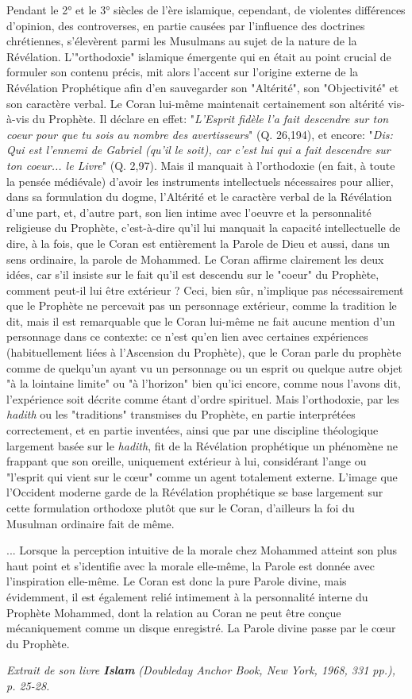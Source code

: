 Pendant le 2° et le 3° siècles de l'ère islamique, cependant, de
violentes différences d'opinion, des controverses, en partie causées par
l'influence des doctrines chrétiennes, s'élevèrent parmi les Musulmans
au sujet de la nature de la Révélation. L'"orthodoxie" islamique
émergente qui en était au point crucial de formuler son contenu précis,
mit alors l'accent sur l'origine externe de la Révélation Prophétique
afin d'en sauvegarder son "Altérité", son "Objectivité" et son caractère
verbal. Le Coran lui-même maintenait certainement son altérité vis-à-vis
du Prophète. Il déclare en effet: "\emph{L'Esprit fidèle l'a fait
descendre sur ton coeur pour que tu sois au nombre des avertisseurs}"
(Q. 26,194), et encore: "\emph{Dis: Qui est l'ennemi de Gabriel (qu'il
le soit), car c'est lui qui a fait descendre sur ton coeur... le Livre}"
(Q. 2,97). Mais il manquait à l'orthodoxie (en fait, à toute la pensée
médiévale) d'avoir les instruments intellectuels nécessaires pour
allier, dans sa formulation du dogme, l'Altérité et le caractère verbal
de la Révélation d'une part, et, d'autre part, son lien intime avec
l'oeuvre et la personnalité religieuse du Prophète, c'est-à-dire qu'il
lui manquait la capacité intellectuelle de dire, à la fois, que le Coran
est entièrement la Parole de Dieu et aussi, dans un sens ordinaire, la
parole de Mohammed. Le Coran affirme clairement les deux idées, car s'il
insiste sur le fait qu'il est descendu sur le "coeur" du Prophète,
comment peut-il lui être extérieur ? Ceci, bien sûr, n'implique pas
nécessairement que le Prophète ne percevait pas un personnage extérieur,
comme la tradition le dit, mais il est remarquable que le Coran lui-même
ne fait aucune mention d'un personnage dans ce contexte: ce n'est qu'en
lien avec certaines expériences (habituellement liées à l'Ascension du
Prophète), que le Coran parle du prophète comme de quelqu'un ayant vu un
personnage ou un esprit ou quelque autre objet "à la lointaine limite"
ou "à l'horizon" bien qu'ici encore, comme nous l'avons dit,
l'expérience soit décrite comme étant d'ordre spirituel. Mais
l'orthodoxie, par les \emph{hadith} ou les "traditions" transmises du
Prophète, en partie interprétées correctement, et en partie inventées,
ainsi que par une discipline théologique largement basée sur le
\emph{hadith}, fit de la Révélation prophétique un phénomène ne frappant
que son oreille, uniquement extérieur à lui, considérant l'ange ou
"l'esprit qui vient sur le cœur" comme un agent totalement externe.
L'image que l'Occident moderne garde de la Révélation prophétique se
base largement sur cette formulation orthodoxe plutôt que sur le Coran,
d'ailleurs la foi du Musulman ordinaire fait de même.

... Lorsque la perception intuitive de la morale chez Mohammed atteint
son plus haut point et s'identifie avec la morale elle-même, la Parole
est donnée avec l'inspiration elle-même. Le Coran est donc la pure
Parole divine, mais évidemment, il est également relié intimement à la
personnalité interne du Prophète Mohammed, dont la relation au Coran ne
peut être conçue mécaniquement comme un disque enregistré. La Parole
divine passe par le cœur du Prophète.

\emph{Extrait de son livre \textbf{Islam} (Doubleday Anchor Book, New
York, 1968, 331 pp.), p. 25-28.}